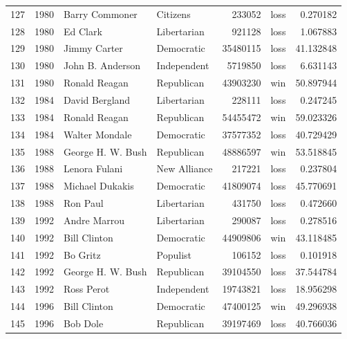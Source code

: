 \documentclass[
  letterpaper,
  DIV=11,
  numbers=noendperiod]{scrreprt}
\begin{document}
\begin{tabular}{lrllrlr}
127 &  1980 &          Barry Commoner &               Citizens &        233052 &   loss &   0.270182 \\
128 &  1980 &                Ed Clark &            Libertarian &        921128 &   loss &   1.067883 \\
129 &  1980 &            Jimmy Carter &             Democratic &      35480115 &   loss &  41.132848 \\
130 &  1980 &        John B. Anderson &            Independent &       5719850 &   loss &   6.631143 \\
131 &  1980 &           Ronald Reagan &             Republican &      43903230 &    win &  50.897944 \\
132 &  1984 &          David Bergland &            Libertarian &        228111 &   loss &   0.247245 \\
133 &  1984 &           Ronald Reagan &             Republican &      54455472 &    win &  59.023326 \\
134 &  1984 &          Walter Mondale &             Democratic &      37577352 &   loss &  40.729429 \\
135 &  1988 &       George H. W. Bush &             Republican &      48886597 &    win &  53.518845 \\
136 &  1988 &           Lenora Fulani &           New Alliance &        217221 &   loss &   0.237804 \\
137 &  1988 &         Michael Dukakis &             Democratic &      41809074 &   loss &  45.770691 \\
138 &  1988 &                Ron Paul &            Libertarian &        431750 &   loss &   0.472660 \\
139 &  1992 &            Andre Marrou &            Libertarian &        290087 &   loss &   0.278516 \\
140 &  1992 &            Bill Clinton &             Democratic &      44909806 &    win &  43.118485 \\
141 &  1992 &                Bo Gritz &               Populist &        106152 &   loss &   0.101918 \\
142 &  1992 &       George H. W. Bush &             Republican &      39104550 &   loss &  37.544784 \\
143 &  1992 &              Ross Perot &            Independent &      19743821 &   loss &  18.956298 \\
144 &  1996 &            Bill Clinton &             Democratic &      47400125 &    win &  49.296938 \\
145 &  1996 &                Bob Dole &             Republican &      39197469 &   loss &  40.766036 \\

\end{tabular}
\end{document}
